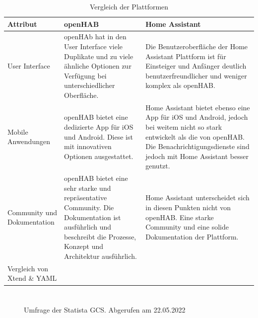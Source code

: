 \documentclass[
  ngerman           %
  ,twoside          %
  ,11pt
  ,pdftex
]{report}
\begin{document}
\begin{table}[hbt!]
  \begin{center}
      \begin{tabular}{| p{3.0cm} | p{6.2cm} | p{6.2cm} | }
          \hline
            \textbf{Attribut} & \textbf{openHAB} & \textbf{Home Assistant} \\
          \hline
            User Interface & openHAb hat in den User Interface viele Duplikate und zu viele ähnliche Optionen zur Verfügung bei unterschiedlicher Oberfläche. & Die Benutzeroberfläche der Home Assistant Plattform ist für Einsteiger und Anfänger deutlich benutzerfreundlicher und weniger komplex als openHAB. \\
          \hline
            Mobile Anwendungen & openHAB bietet eine dedizierte App für iOS und Android. Diese ist mit innovativen Optionen ausgestattet.  & Home Assistant bietet ebenso eine App für iOS und Android, jedoch bei weitem nicht so stark entwickelt als die von openHAB. Die Benachrichtigungsdienste sind jedoch mit Home Assistant besser genutzt. \\ 
          \hline
            Community und Dokumentation & openHAB bietet eine sehr starke und repräsentative Community. Die Dokumentation ist ausführlich und beschreibt die Prozesse, Konzept und Architektur ausführlich. & Home Assistant unterscheidet sich in diesen Punkten nicht von openHAB. Eine starke Community und eine solide Dokumentation der Plattform.  \\
          \hline
            Vergleich von Xtend \& YAML &  &  \\ 
          \hline 
        \end{tabular}
  \end{center}
  \caption{Vergleich der Plattformen \cite{sh-uni-comparison} \cite{msuttner-comparison} \cite{barclay-comparison}}
  \label{tab:comparisonTableHAOS-openHAB-part2}
\end{table}

\chapter{}
\label{appendix:brandings}
\begin{figure}[hbt!]
  \centering
  \caption{Umfrage der Statista GCS. Abgerufen am 22.05.2022}
\end{figure}
\end{document}
